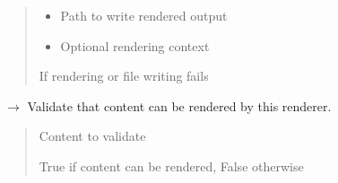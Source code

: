 \documentclass[letterpaper,10pt,english]{sphinxmanual}
\begin{document}
\begin{fulllineitems}
\begin{fulllineitems}
\begin{quote}
\begin{description}
\begin{itemize}
\item {} 
\sphinxAtStartPar
{} \textendash{} Path to write rendered output

\item {} 
\sphinxAtStartPar
{} \textendash{} Optional rendering context

\end{itemize}

\sphinxAtStartPar
{\hyperref[\detokenize{api/renderers:src.renderers.base.renderer.RenderingError}]{}} \textendash{} If rendering or file writing fails

\end{description}\end{quote}

\end{fulllineitems}


\begin{fulllineitems}
\label{\detokenize{api/renderers:src.renderers.base.renderer.BaseRenderer.validate_content}}
\pysigstartsignatures
\pysiglinewithargsret
{}
{}
{{ $\rightarrow$ }}
\pysigstopsignatures
\sphinxAtStartPar
Validate that content can be rendered by this renderer.
\begin{quote}\begin{description}
\sphinxAtStartPar
{} \textendash{} Content to validate

\sphinxAtStartPar
True if content can be rendered, False otherwise

\end{description}\end{quote}

\end{fulllineitems}



\end{fulllineitems}
\end{document}
